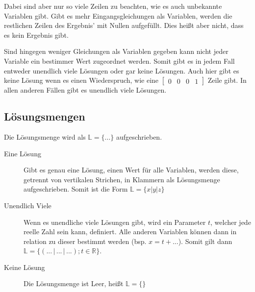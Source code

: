 \documentclass{article}
\begin{document}
\noindent Dabei sind aber nur so viele Zeilen zu beachten, wie es auch unbekannte Variablen gibt. Gibt es mehr Eingangsgleichungen als Variablen, werden die restlichen Zeilen des Ergebnis' mit Nullen aufgefüllt. Dies heißt aber nicht, dass es kein Ergebnis gibt.
 
Sind hingegen weniger Gleichungen als Variablen gegeben kann nicht jeder Variable ein bestimmer Wert zugeordnet werden. Somit gibt es in jedem Fall entweder unendlich viele Lösungen oder gar keine Lösungen. Auch hier gibt es keine Lösung wenn es einen Wiederspruch, wie eine
\(
 \begin{bmatrix}
  0 & 0 & 0 & 1
 \end{bmatrix} 
\)
Zeile gibt. In allen anderen Fällen gibt es unendlich viele Lösungen. 
 
\subsection{Lösungsmengen}
Die Lösungsmenge wird als $\mathbb{L} = \{...\}$ aufgeschrieben.
 
\begin{description}
 \item[Eine Lösung] Gibt es genau eine Lösung, einen Wert für alle Variablen, werden diese, getrennt von vertikalen Strichen, in Klammern als Lösungsmenge aufgeschrieben. Somit ist die Form $\mathbb{L} = \{x \vert y \vert z\}$
  
 \item[Unendlich Viele] Wenn es unendliche viele Lösungen gibt, wird ein Parameter $t$, welcher jede reelle Zahl sein kann, definiert. Alle anderen Variablen können dann in relation zu dieser bestimmt werden (bsp. $x = t + ...$).
Somit gilt dann $\mathbb{L} = \{(... \,\vert\, ... \,\vert\, ...); t \in \mathbb{R}\}$.
 
 \item[Keine Lösung] Die Lösungsmenge ist Leer, heißt $\mathbb{L} = \{\}$
\end{description}
\end{document}
